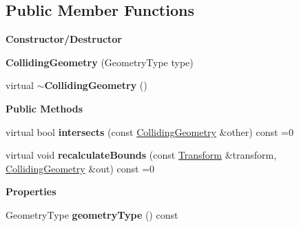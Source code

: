 \subsection*{Public Member Functions}
\begin{Indent}\textbf{ Constructor/\+Destructor}\par
\begin{DoxyCompactItemize}
\item 
\mbox{\label{classrev_1_1_colliding_geometry_aaa57ec1e5dcd86f9af5b1ce194fe05b7}} 
{\bfseries Colliding\+Geometry} (Geometry\+Type type)
\item 
\mbox{\label{classrev_1_1_colliding_geometry_a8933214a8b918d2864f1ae217c409c09}} 
virtual {\bfseries $\sim$\+Colliding\+Geometry} ()
\end{DoxyCompactItemize}
\end{Indent}
\begin{Indent}\textbf{ Public Methods}\par
\begin{DoxyCompactItemize}
\item 
\mbox{\label{classrev_1_1_colliding_geometry_a007921279d0cc439f865610fa7593220}} 
virtual bool {\bfseries intersects} (const \mbox{\hyperlink{classrev_1_1_colliding_geometry}{Colliding\+Geometry}} \&other) const =0
\item 
\mbox{\label{classrev_1_1_colliding_geometry_a93d9a6a5b2a3b07c38fd435384ee5297}} 
virtual void {\bfseries recalculate\+Bounds} (const \mbox{\hyperlink{classrev_1_1_transform}{Transform}} \&transform, \mbox{\hyperlink{classrev_1_1_colliding_geometry}{Colliding\+Geometry}} \&out) const =0
\end{DoxyCompactItemize}
\end{Indent}
\begin{Indent}\textbf{ Properties}\par
\begin{DoxyCompactItemize}
\item 
\mbox{\label{classrev_1_1_colliding_geometry_ad605657cdbaf75a1a76ea8f107fb8e77}} 
Geometry\+Type {\bfseries geometry\+Type} () const
\end{DoxyCompactItemize}
\end{Indent}

